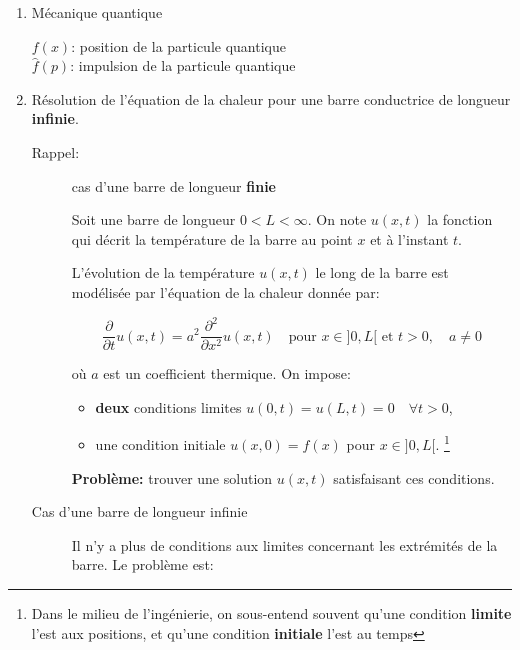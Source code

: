 \begin{enumerate}[label=\alph*)]
    fonction gaussienne $f(x) = e^{-\frac{x^2}{2}} \quad \forall x\in \R$
    
    \textit{Ex. 4, série 1}: $\hat{f}(\alpha) = e^{-\frac{\alpha^2}{2}}$ est aussi une fonction gaussienne.
    
    
    \item
    Mécanique quantique
    
    $f(x)$: position de la particule quantique\\
    $\hat{f}(p)$: impulsion de la particule quantique
    
    
    \item
    Résolution de l'équation de la chaleur pour une barre conductrice de longueur \textbf{infinie}.
    
    \begin{description}
    \item[Rappel:] cas d'une barre de longueur \textbf{finie}
    
    Soit une barre de longueur $0 < L < \infty$.
    On note $u(x,t)$ la fonction qui décrit la température de la barre au point $x$ et à l'instant $t$.
    
    L'évolution de la température $u(x,t)$ le long de la barre est modélisée par l'équation de la chaleur donnée par:
    
    \[
    \frac{\partial}{\partial t} u(x,t) = a^2 \frac{\partial^2}{\partial x^2} u(x,t) \quad \textrm{pour } x \in ]0,L[ \textrm{ et } t > 0, \quad a \neq 0
    \]
    
    où $a$ est un coefficient thermique.
    On impose:
    \begin{itemize}
    \item \textbf{deux} conditions limites $u(0,t) = u(L,t) = 0 \quad \forall t > 0$,
    \item une condition initiale $u(x,0) = f(x)$ pour $x \in ]0,L[$. \footnote{Dans le milieu de l'ingénierie, on sous-entend souvent qu'une condition \textbf{limite} l'est aux positions, et qu'une condition \textbf{initiale} l'est au temps}
    \end{itemize} 

    \textbf{Problème:} trouver une solution $u(x,t)$ satisfaisant ces conditions.
    
    \item[Cas d'une barre de longueur infinie]\hfill
    
    Il n'y a plus de conditions aux limites concernant les extrémités de la barre.
    Le problème est:
    

\end{description}
\end{enumerate}
